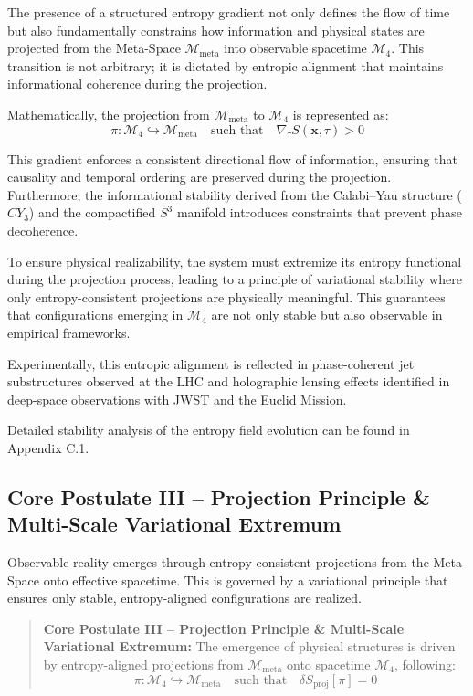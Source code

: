 \documentclass[10.5pt,a4paper]{article}
\begin{document}
The presence of a structured entropy gradient not only defines the flow of time but also fundamentally constrains how information and physical states are projected from the Meta-Space \(\mathcal{M}_{\text{meta}}\) into observable spacetime \(\mathcal{M}_4\). This transition is not arbitrary; it is dictated by entropic alignment that maintains informational coherence during the projection.

Mathematically, the projection from \(\mathcal{M}_{\text{meta}}\) to \(\mathcal{M}_4\) is represented as:
\[
\pi: \mathcal{M}_4 \hookrightarrow \mathcal{M}_{\text{meta}} \quad \text{such that} \quad \nabla_\tau S(\mathbf{x}, \tau) > 0
\]

This gradient enforces a consistent directional flow of information, ensuring that causality and temporal ordering are preserved during the projection. Furthermore, the informational stability derived from the Calabi--Yau structure (\(CY_3\)) and the compactified \(S^3\) manifold introduces constraints that prevent phase decoherence.

To ensure physical realizability, the system must extremize its entropy functional during the projection process, leading to a principle of variational stability where only entropy-consistent projections are physically meaningful. This guarantees that configurations emerging in \(\mathcal{M}_4\) are not only stable but also observable in empirical frameworks.

Experimentally, this entropic alignment is reflected in phase-coherent jet substructures observed at the LHC and holographic lensing effects identified in deep-space observations with JWST and the Euclid Mission.

Detailed stability analysis of the entropy field evolution can be found in Appendix C.1.

\subsection{Core Postulate III – Projection Principle \& Multi-Scale Variational Extremum}

Observable reality emerges through entropy-consistent projections from the Meta-Space onto effective spacetime. This is governed by a variational principle that ensures only stable, entropy-aligned configurations are realized.

\begin{quote}
\textbf{Core Postulate III – Projection Principle \& Multi-Scale Variational Extremum:}  
The emergence of physical structures is driven by entropy-aligned projections from \(\mathcal{M}_{\text{meta}}\) onto spacetime \(\mathcal{M}_4\), following:
\[
\pi: \mathcal{M}_4 \hookrightarrow \mathcal{M}_{\text{meta}} \quad \text{such that} \quad \delta S_{\text{proj}}[\pi] = 0
\]
\end{quote}
\end{document}
